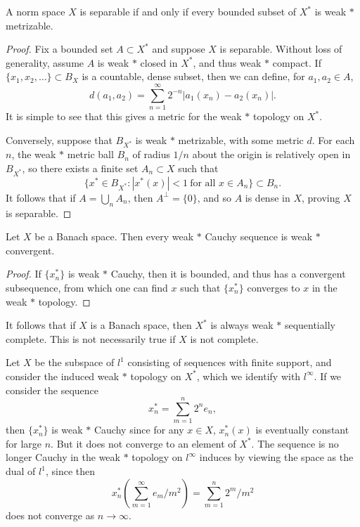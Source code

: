\begin{corollary}
    A norm space $X$ is separable if and only if every bounded subset of $X^*$ is weak $*$ metrizable.
\end{corollary}
\begin{proof}
    Fix a bounded set $A \subset X^*$ and suppose $X$ is separable. Without loss of generality, assume $A$ is weak $*$ closed in $X^*$, and thus weak $*$ compact. If $\{ x_1, x_2, \dots \} \subset B_X$ is a countable, dense subset, then we can define, for $a_1,a_2 \in A$,
    \[ d(a_1, a_2) = \sum_{n = 1}^\infty 2^{-n} |a_1(x_n) - a_2(x_n)|. \]
    It is simple to see that this gives a metric for the weak $*$ topology on $X^*$.

    Conversely, suppose that $B_{X^*}$ is weak $*$ metrizable, with some metric $d$. For each $n$, the weak $*$ metric ball $B_n$ of radius $1/n$ about the origin is relatively open in $B_{X^*}$, so there exists a finite set $A_n \subset X$ such that
    \[ \{ x^* \in B_{X^*}: |x^*(x)| < 1\ \text{for all $x \in A_n$} \} \subset B_n. \]
    It follows that if $A = \bigcup_n A_n$, then $A^\perp = \{ 0 \}$, and so $A$ is dense in $X$, proving $X$ is separable.
\end{proof}

\begin{corollary}
    Let $X$ be a Banach space. Then every weak $*$ Cauchy sequence is weak $*$ convergent.
\end{corollary}
\begin{proof}
    If $\{ x_n^* \}$ is weak $*$ Cauchy, then it is bounded, and thus has a convergent subsequence, from which one can find $x$ such that $\{ x_n^* \}$ converges to $x$ in the weak $*$ topology.
\end{proof}

It follows that if $X$ is a Banach space, then $X^*$ is always weak $*$ sequentially complete. This is not necessarily true if $X$ is not complete.

\begin{example}
    Let $X$ be the subspace of $l^1$ consisting of sequences with finite support, and consider the induced weak $*$ topology on $X^*$, which we identify with $l^\infty$. If we consider the sequence
    \[ x_n^* = \sum_{m = 1}^n 2^n e_n, \]
    then $\{ x_n^* \}$ is weak $*$ Cauchy since for any $x \in X$, $x_n^*(x)$ is eventually constant for large $n$. But it does not converge to an element of $X^*$. The sequence is no longer Cauchy in the weak $*$ topology on $l^\infty$ induces by viewing the space as the dual of $l^1$, since then
    \[ x_n^* \left( \sum_{m = 1}^\infty e_m / m^2 \right) = \sum_{m = 1}^n 2^m / m^2 \]
    does not converge as $n \to \infty$.
\end{example} 

